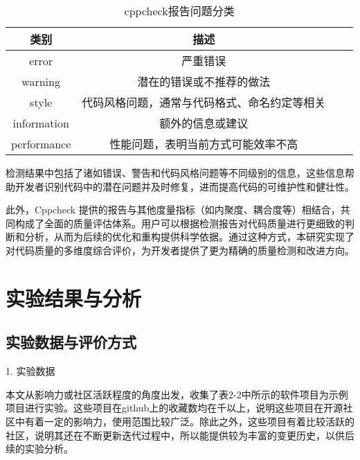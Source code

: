 \begin{table}[htbp]
\caption{cppcheck报告问题分类}
\vspace{0.5em}\centering\wuhao
\begin{tabular}{cccc}
\toprule
类别 & 描述 \\
\midrule
error &  严重错误 \\
warning & 潜在的错误或不推荐的做法 \\
style & 代码风格问题，通常与代码格式、命名约定等相关 \\
information & 额外的信息或建议 \\ 
performance & 性能问题，表明当前方式可能效率不高 \\ 
\bottomrule
\end{tabular}
\end{table}

检测结果中包括了诸如错误、警告和代码风格问题等不同级别的信息，这些信息帮助开发者识别代码中的潜在问题并及时修复，进而提高代码的可维护性和健壮性。

此外，Cppcheck 提供的报告与其他度量指标（如内聚度、耦合度等）相结合，共同构成了全面的质量评估体系。用户可以根据检测报告对代码质量进行更细致的判断和分析，从而为后续的优化和重构提供科学依据。通过这种方式，本研究实现了对代码质量的多维度综合评价，为开发者提供了更为精确的质量检测和改进方向。


\section{实验结果与分析}

\subsection{实验数据与评价方式}

1. 实验数据

本文从影响力或社区活跃程度的角度出发，收集了表2-2中所示的软件项目为示例项目进行实验。这些项目在github上的收藏数均在千以上，说明这些项目在开源社区中有着一定的影响力，使用范围比较广泛。除此之外，这些项目有着比较活跃的社区，说明其还在不断更新迭代过程中，所以能提供较为丰富的变更历史，以供后续的实验分析。

